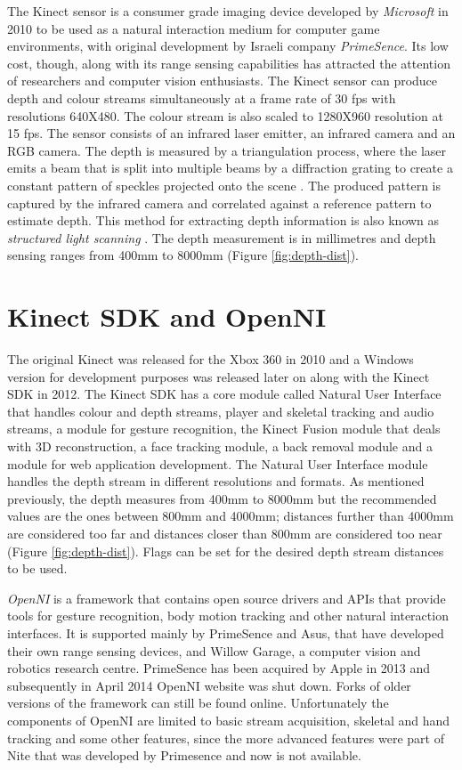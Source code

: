 The Kinect sensor is a consumer grade imaging device developed by \textit{Microsoft} in 2010 to be used as a natural interaction medium for computer game environments, with original development by Israeli company \textit{PrimeSence}. Its low cost, though, along with its range sensing capabilities has attracted the attention of researchers and computer vision enthusiasts. The Kinect sensor can produce depth and colour streams simultaneously at a frame rate of 30 fps with resolutions 640X480. The colour stream is also scaled to 1280X960 resolution at 15 fps. The sensor consists of an infrared laser emitter, an infrared camera and an RGB camera. The depth is measured by a triangulation process, where the laser emits a beam that is split into multiple beams by a diffraction grating to create a constant pattern of speckles projected onto the scene \cite{kinectaccuracy}. The produced pattern is captured by the infrared camera and correlated against a reference pattern to estimate depth. This method for extracting depth information is also known as \textit{structured light scanning} \cite{kinectaccuracy}. The depth measurement is in millimetres and depth sensing ranges from 400mm to 8000mm (Figure \ref{fig:depth-dist}).

\section{Kinect SDK and OpenNI}
\label{sec:openni}

The original Kinect was released for the Xbox 360 in 2010 and a Windows version for development purposes was released later on along with the Kinect SDK in 2012. The Kinect SDK has a core module called Natural User Interface that handles colour and depth streams, player and skeletal tracking and audio streams, a module for gesture recognition, the Kinect Fusion module that deals with 3D reconstruction, a face tracking module, a back removal module and a module for web application development. The Natural User Interface module handles the depth stream in different resolutions and formats. As mentioned previously, the depth measures from 400mm to 8000mm but the recommended values are the ones between 800mm and 4000mm; distances further than 4000mm are considered too far and distances closer than 800mm are considered too near (Figure \ref{fig:depth-dist}). Flags can be set for the desired depth stream distances to be used.
\par
\textit{OpenNI} is a framework that contains open source drivers and APIs that provide tools for gesture recognition, body motion tracking and other natural interaction interfaces. It is supported mainly by PrimeSence and Asus, that have developed their own range sensing devices, and Willow Garage, a computer vision and robotics research centre. PrimeSence has been acquired by Apple in 2013 and subsequently in April 2014 OpenNI website was shut down. Forks of older versions of the framework can still be found online. Unfortunately the components of OpenNI are limited to basic stream acquisition, skeletal and hand tracking and some other features, since the more advanced features were part of Nite that was developed by Primesence and now is not available.


